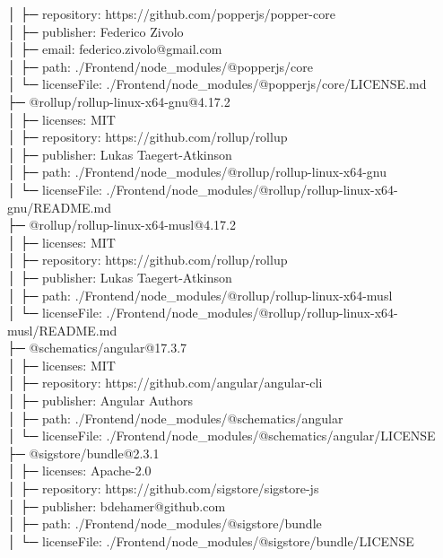 │  ├─ repository: https://github.com/popperjs/popper-core\\
│  ├─ publisher: Federico Zivolo\\
│  ├─ email: federico.zivolo@gmail.com\\
│  ├─ path: ./Frontend/node\_modules/@popperjs/core\\
│  └─ licenseFile: ./Frontend/node\_modules/@popperjs/core/LICENSE.md\\
├─ @rollup/rollup-linux-x64-gnu@4.17.2\\
│  ├─ licenses: MIT\\
│  ├─ repository: https://github.com/rollup/rollup\\
│  ├─ publisher: Lukas Taegert-Atkinson\\
│  ├─ path: ./Frontend/node\_modules/@rollup/rollup-linux-x64-gnu\\
│  └─ licenseFile: ./Frontend/node\_modules/@rollup/rollup-linux-x64-gnu/README.md\\
├─ @rollup/rollup-linux-x64-musl@4.17.2\\
│  ├─ licenses: MIT\\
│  ├─ repository: https://github.com/rollup/rollup\\
│  ├─ publisher: Lukas Taegert-Atkinson\\
│  ├─ path: ./Frontend/node\_modules/@rollup/rollup-linux-x64-musl\\
│  └─ licenseFile: ./Frontend/node\_modules/@rollup/rollup-linux-x64-musl/README.md\\
├─ @schematics/angular@17.3.7\\
│  ├─ licenses: MIT\\
│  ├─ repository: https://github.com/angular/angular-cli\\
│  ├─ publisher: Angular Authors\\
│  ├─ path: ./Frontend/node\_modules/@schematics/angular\\
│  └─ licenseFile: ./Frontend/node\_modules/@schematics/angular/LICENSE\\
├─ @sigstore/bundle@2.3.1\\
│  ├─ licenses: Apache-2.0\\
│  ├─ repository: https://github.com/sigstore/sigstore-js\\
│  ├─ publisher: bdehamer@github.com\\
│  ├─ path: ./Frontend/node\_modules/@sigstore/bundle\\
│  └─ licenseFile: ./Frontend/node\_modules/@sigstore/bundle/LICENSE\\
